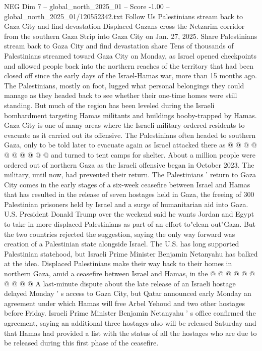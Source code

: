 \begin{textsample}{NEG Dim 7 – global\_north\_2025\_01 – Score -1.00 – global\_north\_2025\_01/120552342.txt}  \label{ex:f7_neg_181}
Follow Us Palestinians stream back to Gaza City and find devastation Displaced Gazans cross the Netzarim corridor from the southern Gaza Strip into Gaza City on Jan. 27, 2025.
Share Palestinians stream back to Gaza City and find devastation share Tens of thousands of Palestinians streamed toward Gaza City on Monday, as Israel opened checkpoints and allowed people back into the northern reaches of the territory that had been closed off since the early days of the Israel-Hamas war, more than 15 months ago.
The Palestinians, mostly on foot, lugged what personal belongings they could manage as they headed back to see whether their one-time homes were still standing.
But much of the region has been leveled during the Israeli bombardment targeting Hamas militants and buildings booby-trapped by Hamas.
Gaza City is one of many areas where the Israeli military ordered residents to evacuate as it carried out its offensive.
The Palestinians often headed to southern Gaza, only to be told later to evacuate again as Israel attacked there as @ @ @ @ @ @ @ @ @ @ and turned to tent camps for shelter.
About a million people were ordered out of northern Gaza as the Israeli offensive began in October 2023.
The military, until now, had prevented their return.
The Palestinians ' return to Gaza City comes in the early stages of a six-week ceasefire between Israel and Hamas that has resulted in the release of seven hostages held in Gaza, the freeing of 300 Palestinian prisoners held by Israel and a surge of humanitarian aid into Gaza.
U.S.
President Donald Trump over the weekend said he wants Jordan and Egypt to take in more displaced Palestinians as part of an effort to"clean out"Gaza.
But the two countries rejected the suggestion, saying the only way forward was creation of a Palestinian state alongside Israel.
The U.S. has long supported Palestinian statehood, but Israeli Prime Minister Benjamin Netanyahu has balked at the idea.
Displaced Palestinians make their way back to their homes in northern Gaza, amid a ceasefire between Israel and Hamas, in the @ @ @ @ @ @ @ @ @ @ A last-minute dispute about the late release of an Israeli hostage delayed Monday ' s access to Gaza City, but Qatar announced early Monday an agreement under which Hamas will free Arbel Yehoud and two other hostages before Friday.
Israeli Prime Minister Benjamin Netanyahu ' s office confirmed the agreement, saying an additional three hostages also will be released Saturday and that Hamas had provided a list with the status of all the hostages who are due to be released during this first phase of the ceasefire.

\end{textsample}
